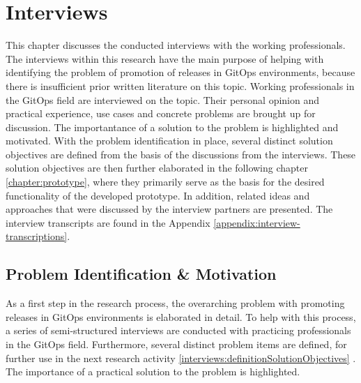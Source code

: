 

\chapter{Interviews}
\label{interviews}

This chapter discusses the conducted interviews with the working professionals.
The interviews within this research have the main purpose of helping with
identifying the problem of promotion of releases in GitOps environments,
because there is insufficient prior written literature on this topic.
Working professionals in the GitOps field are interviewed on the topic.
Their personal opinion and practical experience, use cases and concrete problems
are brought up for discussion. The importantance of a solution to the
problem is highlighted and motivated.
With the problem identification in place, several distinct solution objectives
are defined from the basis of the discussions from the interviews.
These solution objectives are then further elaborated in the following chapter
\ref{chapter:prototype}, where they primarily serve as the basis for the
desired functionality of the developed prototype.
In addition, related ideas and approaches that were discussed by the interview partners
are presented.
The interview transcripts are found in the Appendix \ref{appendix:interview-transcriptions}.

\section{Problem Identification \& Motivation}
\label{interviews:problem-identification}

As a first step in the research process,
the overarching problem with promoting releases in GitOps environments
is elaborated in detail.
To help with this process, a series of semi-structured interviews are conducted with
practicing professionals in the GitOps field.
Furthermore, several distinct problem items are defined,
for further use in the next research activity
\ref{interviews:definitionSolutionObjectives} .
The importance of a practical solution to the problem is highlighted.

